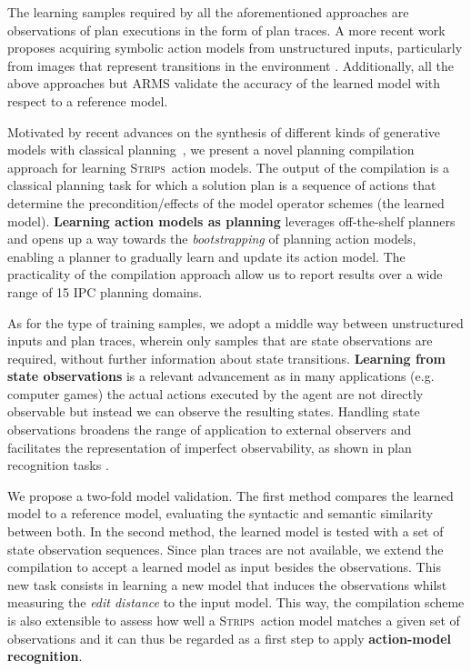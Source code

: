 \documentclass{article}
\newcommand{\strips}{\textsc{Strips}}     %
\begin{document}
The learning samples required by all the aforementioned approaches are observations of plan executions in the form of plan traces. A more recent work proposes acquiring symbolic action models from unstructured inputs, particularly from images that represent transitions in the environment \cite{AsaiF18}. Additionally, all the above approaches but {\sc ARMS} validate the accuracy of the learned model with respect to a reference model.

Motivated by recent advances on the synthesis of different kinds of generative models with classical planning~\cite{bonet2009automatic,segovia2016hierarchical,segovia2017generating}, we present a novel planning compilation approach for learning \strips\ action models. The output of the compilation is a classical planning task for which a solution plan is a sequence of actions that determine the precondition/effects of the model operator schemes (the learned model). \textbf{Learning action models as planning} leverages off-the-shelf planners and opens up a way towards the \emph{bootstrapping} of planning action models, enabling a planner to gradually learn and update its action model. The practicality of the compilation approach allow us to report results over a wide range of 15 IPC planning domains.

As for the type of training samples, we adopt a middle way between unstructured inputs and plan traces, wherein only samples that are state observations are required, without further information about state transitions. \textbf{Learning from state observations} is a relevant advancement as in many applications (e.g. computer games) the actual actions executed by the agent are not directly observable but instead we can observe the resulting states. Handling state observations broadens the range of application to external observers and facilitates the representation of imperfect observability, as shown in plan recognition tasks \cite{SohrabiRU16}.

We propose a two-fold model validation. The first method compares the learned model to a reference model, evaluating the syntactic and semantic similarity between both. In the second method, the learned model is tested with a set of state observation sequences. Since plan traces are not available, we extend the compilation to accept a learned model as input besides the observations. This new task consists in learning a new model that induces the observations whilst measuring the \emph{edit distance} to the input model. This way, the compilation scheme is also extensible to assess how well a \strips\ action model matches a given set of observations and it can thus be regarded as a first step to apply \textbf{action-model recognition}.
\end{document}
